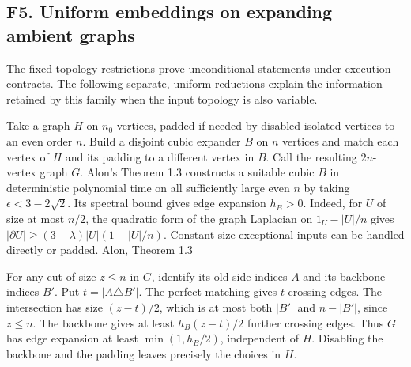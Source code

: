 \documentclass[11pt,a4paper]{article}
\begin{document}
\subsection{F5. Uniform embeddings on expanding ambient
graphs}\label{v8-f5.-uniform-embeddings-on-expanding-ambient-graphs}

The fixed-topology restrictions prove unconditional statements under
execution contracts. The following separate, uniform reductions explain
the information retained by this family when the input topology is also
variable.

Take a graph \(H\) on \(n_0\) vertices, padded if needed by disabled
isolated vertices to an even order \(n\). Build a disjoint cubic
expander \(B\) on \(n\) vertices and match each vertex of \(H\) and its
padding to a different vertex in \(B\). Call the resulting \(2n\)-vertex
graph \(G\). Alon's Theorem 1.3 constructs a suitable cubic \(B\) in
deterministic polynomial time on all sufficiently large even \(n\) by
taking \(\epsilon<3-2\sqrt2\). Its spectral bound gives edge expansion
\(h_B>0\). Indeed, for \(U\) of size at most \(n/2\), the quadratic form
of the graph Laplacian on \(1_U-|U|/n\) gives
\(|\partial U|\ge(3-\lambda)|U|(1-|U|/n)\). Constant-size exceptional
inputs can be handled directly or padded.
\href{https://web.math.princeton.edu/~nalon/PDFS/expexpg.pdf}{Alon,
Theorem 1.3}

For any cut of size \(z\le n\) in \(G\), identify its old-side indices
\(A\) and its backbone indices \(B'\). Put \(t=|A\triangle B'|\). The
perfect matching gives \(t\) crossing edges. The intersection has size
\((z-t)/2\), which is at most both \(|B'|\) and \(n-|B'|\), since
\(z\le n\). The backbone gives at least \(h_B(z-t)/2\) further crossing
edges. Thus \(G\) has edge expansion at least \(\min(1,h_B/2)\),
independent of \(H\). Disabling the backbone and the padding leaves
precisely the choices in \(H\).
\end{document}
